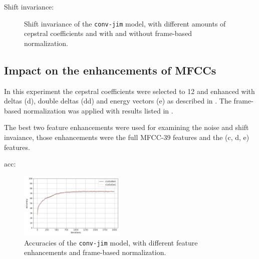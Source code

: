 Shift invariance:
\begin{figure}[!ht]
  \centering
  \caption{Shift invariance of the \texttt{conv-jim} model, with different amounts of cepstral coefficients and with and without frame-based normalization.}
  \label{fig:exp_fs_cepstral_tb_noise_conv-jim}
\end{figure}
\FloatBarrier
\noindent




\subsection{Impact on the enhancements of MFCCs}\label{sec:exp_fs_mfcc}
In this experiment the cepstral coefficients were selected to 12 and enhanced with deltas (d), double deltas (dd) and energy vectors (e) as described in .
The frame-based normalization was applied with results listed in .

The best two feature enhancements were used for examining the noise and shift invaiance, those enhancements were the full MFCC-39 features and the (c, d, e) features.

acc:
\begin{figure}[!ht]
  \centering
  \includegraphics[width=0.45\textwidth]{./5_exp/figs/exp_fs_mfcc_acc_conv-jim}
  \caption{Accuracies of the \texttt{conv-jim} model, with different feature enhancements and frame-based normalization.}
  \label{fig:exp_fs_mfcc_tb_acc_conv-jim}
\end{figure}
\FloatBarrier
\noindent


